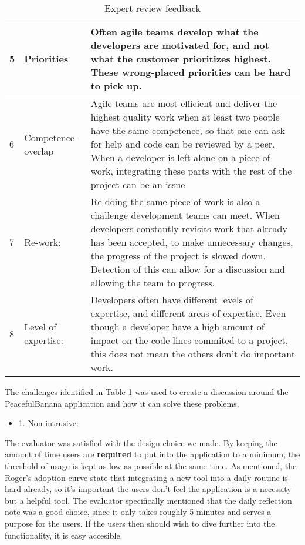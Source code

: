 \begin{table}[H]
\begin{tabularx}{\textwidth}{|l|l|X|}
    5  & Priorities          & Often agile teams develop what the developers are motivated for, and not what the customer prioritizes highest. These wrong-placed priorities can be hard to pick up.                                                                                                                                                                                          \\ \hline
    6  & Competence-overlap  & Agile teams are most efficient and deliver the highest quality work when at least two people have the same competence, so that one can ask for help and code can be reviewed by a peer. When a developer is left alone on a piece of work, integrating these parts with the rest of the project can be an issue                                                 \\ \hline
    7  & Re-work:            & Re-doing the same piece of work is also a challenge development teams can meet. When developers constantly revisits work that already has been accepted, to make unnecessary changes, the progress of the project is slowed down. Detection of this can allow for a discussion and allowing the team to progress.                                              \\ \hline
    8  & Level of expertise: & Developers often have different levels of expertise, and different areas of expertise. Even though a developer have a high amount of impact on the code-lines commited to a project, this does not mean the others don't do important work.                                                                                                                    \\ \hline
    \end{tabularx}
    \caption {Expert review feedback}
    \label{experttable}
\end{table}
\clearpage
The challenges identified in Table \ref{experttable} was used to create a discussion around the PeacefulBanana application and how it can solve these problems. 
\begin{itemize}
    \item 1. Non-intrusive:
\end{itemize}
The evaluator was satisfied with the design choice we made. By keeping the amount of time users are \textbf{required} to put into the application to a minimum, the threshold of usage is kept as low as possible at the same time. As mentioned, the Roger's adoption curve state that integrating a new tool into a daily routine is hard already, so it's important the users don't feel the application is a necessity but a helpful tool. The evaluator specifically mentioned that the daily reflection note was a good choice, since it only takes roughly 5 minutes and serves a purpose for the users. If the users then should wish to dive further into the functionality, it is easy accesible. 

